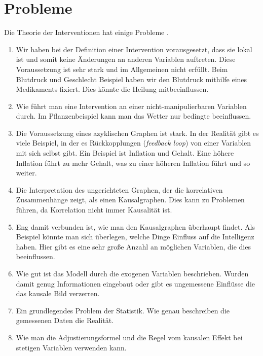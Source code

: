 \documentclass[headsepline,11pt,bibliography=leveldown]{scrbook}
\newcommand{\en}[1]{{\scriptsize(\textit{#1})}}
\begin{document}
\section{Probleme}
Die Theorie der Interventionen hat einige Probleme \cite[S. 12f]{Paper}.
\begin{enumerate}[label=(\roman*)]
\item Wir haben bei der Definition einer Intervention vorausgesetzt, dass sie lokal ist und somit keine Änderungen an anderen Variablen auftreten. Diese Voraussetzung ist sehr stark und im Allgemeinen nicht erfüllt. Beim Blutdruck und Geschlecht Beispiel haben wir den Blutdruck mithilfe eines Medikaments fixiert. Dies könnte die Heilung mitbeeinflussen.
\item Wie führt man eine Intervention an einer nicht-manipulierbaren Variablen durch. Im Pflanzenbeispiel kann man das Wetter nur bedingte beeinflussen.
\item Die Voraussetzung eines azyklischen Graphen ist stark. In der Realität gibt es viele Beispiel, in der es Rückkopplungen \en{feedback loop} von einer Variablen mit sich selbst gibt. Ein Beispiel ist Inflation und Gehalt. Eine höhere Inflation führt zu mehr Gehalt, was zu einer höheren Inflation führt und so weiter.
\item Die Interpretation des ungerichteten Graphen, der die korrelativen Zusammenhänge zeigt, als einen Kausalgraphen. Dies kann zu Problemen führen, da Korrelation nicht immer Kausalität ist.
\item Eng damit verbunden ist, wie man den Kausalgraphen überhaupt findet. Als Beispiel könnte man sich überlegen, welche Dinge Einfluss auf die Intelligenz haben. Hier gibt es eine sehr große Anzahl an möglichen Variablen, die dies beeinflussen.
\item Wie gut ist das Modell durch die exogenen Variablen beschrieben. Wurden damit genug Informationen eingebaut oder gibt es ungemessene Einflüsse die das kausale Bild verzerren.
\item Ein grundlegendes Problem der Statistik. Wie genau beschreiben die gemessenen Daten die Realität.
\item Wie man die Adjustierungsformel und die Regel vom kausalen Effekt bei stetigen Variablen verwenden kann.
\end{enumerate}
\end{document}
